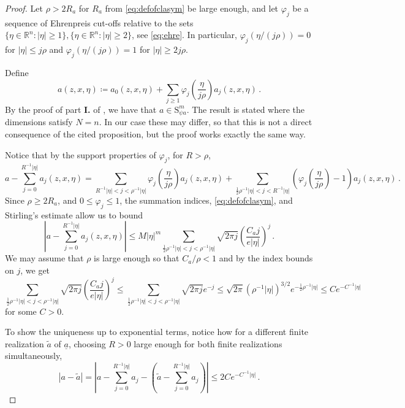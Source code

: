 \documentclass[
	fontsize=11pt, 
	twoside=false, 
	abstract=true, 
	a4paper,
]{scrartcl}
\newcommand{\RR}{\mathbb{R}}
\newcommand{\abs}[1]{\left\lvert#1\right\rvert}
\newcommand{\td}[1]{\tilde{#1}}
\newcommand{\ud}[1]{\underline{#1}}
\begin{document}
\begin{proof}
	Let $\rho > 2R_a$ for $R_a$ from \cref{eq:defofclasym} be large enough, and let $\varphi_j$ be a sequence of Ehrenpreis cut-offs relative to the sets $\{\eta \in \RR^n\colon \abs{\eta} \geq 1\}, \{\eta \in \RR^n\colon \abs{\eta} \geq 2\}$, see \cref{eq:ehre}. In particular, $\varphi_j(\eta/(j\rho)) = 0$ for $\abs{\eta} \leq j\rho$ and  $\varphi_j(\eta/(j\rho)) = 1$ for $\abs{\eta} \geq 2j\rho$.

	Define
	\[
		a(z,x,\eta) \coloneqq a_0(z,x,\eta) + \sum_{j\geq 1} \varphi_j\left(\frac{\eta}{j \rho}\right)a_j(z,x,\eta)\,.
	\]
	By the proof of part \textbf{I.} of \cite[Prop.~17.2.5]{MR4436039}, we have that $a \in \mathrm{S}^m_{\psi a}$. The result \cite[Prop.~17.2.5]{MR4436039} is stated where the dimensions satisfy $N=n$. In our case these may differ, so that this is not a direct consequence of the cited proposition, but the proof works exactly the same way. 

	Notice that by the support properties of $\varphi_j$, for $R> \rho$,
	\[
		a - \sum_{j=0}^{R^{-1}\abs{\eta}} a_j(z,x,\eta) =  \sum_{R^{-1}\abs{\eta} < j < \rho^{-1}\abs{\eta}} \varphi_j\left(\frac{\eta}{j\rho}\right) a_j(z,x,\eta) + \sum_{\frac{1}{2}\rho^{-1} \abs{\eta} < j < R^{-1}\abs{\eta}} \left(\varphi_j\left(\frac{\eta}{j\rho}\right) - 1\right)a_j(z,x,\eta)\,.
	\]
	Since $\rho \geq 2R_a$, and $0 \leq \varphi_j \leq 1$, the summation indices, \cref{eq:defofclasym}, and Stirling's estimate allow us to bound
	\[
		\abs{a - \sum_{j=0}^{R^{-1}\abs{\eta}} a_j(z,x,\eta)} \leq M\abs{\eta}^m \sum_{\frac{1}{2}\rho^{-1}\abs{\eta} < j < \rho^{-1}\abs{\eta}}\sqrt{2\pi j} \left(\frac{C_a j}{e\abs{\eta}}\right)^j\,. %
	\]
	We may assume that $\rho$ is large enough so that $C_a/\rho < 1$ and by the index bounds on $j$, we get 
	\[
		\sum_{\frac{1}{2}\rho^{-1}\abs{\eta} < j < \rho^{-1}\abs{\eta}} \sqrt{2\pi j}\left(\frac{C_aj}{e\abs{\eta}}\right)^j \leq \sum_{\frac{1}{2}\rho^{-1} \abs{\eta} < j < \rho^{-1}\abs{\eta}}\sqrt{2\pi j}e^{-j} %
		\leq \sqrt{2\pi} (\rho^{-1}\abs{\eta})^{3/2} e^{-\frac{1}{2}\rho^{-1}\abs{\eta}} \leq Ce^{-C^{-1}\abs{\eta}}
	\]
	for some $C>0$.%

	To show the uniqueness up to exponential terms, notice how for a different finite realization $\td{a}$ of $\ud{a}$, choosing $R>0$ large enough for both finite realizations simultaneously,
	\[
		\abs{a - \td{a}} = \abs{a - \sum_{j=0}^{R^{-1}\abs{\eta}} a_j - \left(\td{a} - \sum_{j=0}^{R^{-1}\abs{\eta}} a_j\right)} \leq 2Ce^{-C^{-1}\abs{\eta}}\,.
	\]
\end{proof}
\end{document}
